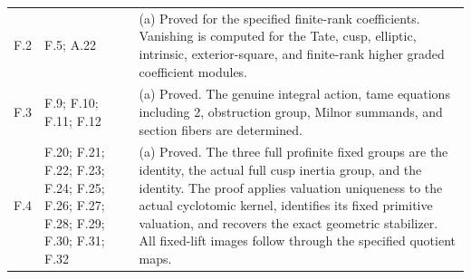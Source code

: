 \begin{longtable}{@{}p{1.1cm}p{3.0cm}p{10.3cm}@{}}
F.2 & F.5; A.22 & (a) Proved for the specified finite-rank coefficients. Vanishing is computed for the Tate, cusp, elliptic, intrinsic, exterior-square, and finite-rank higher graded coefficient modules. \\
F.3 & F.9; F.10; F.11; F.12 & (a) Proved. The genuine integral action, tame equations including 2, obstruction group, Milnor summands, and section fibers are determined. \\
F.4 & F.20; F.21; F.22; F.23; F.24; F.25; F.26; F.27; F.28; F.29; F.30; F.31; F.32 & (a) Proved. The three full profinite fixed groups are the identity, the actual full cusp inertia group, and the identity. The proof applies valuation uniqueness to the actual cyclotomic kernel, identifies its fixed primitive valuation, and recovers the exact geometric stabilizer. All fixed-lift images follow through the specified quotient maps. \\
\bottomrule\end{longtable}

